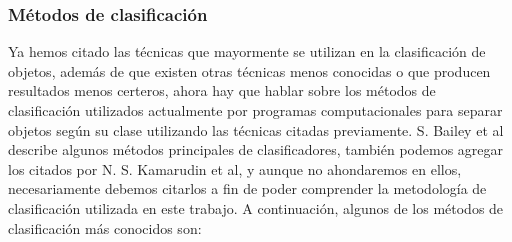 \documentclass[a4paper,12pt,twoside]{article}
\begin{document}
\subsubsection{Métodos de clasificación}
Ya hemos citado las técnicas que mayormente se utilizan en la clasificación de objetos, además de que existen otras técnicas menos conocidas o que producen resultados menos certeros, ahora hay que hablar sobre los métodos de clasificación utilizados actualmente por programas computacionales para separar objetos según su clase utilizando las técnicas citadas previamente.
S. Bailey et al \cite{bailey} describe algunos métodos principales de clasificadores, también podemos agregar los citados por N. S. Kamarudin et al\cite{kamarudin}, y aunque no ahondaremos en ellos, necesariamente debemos citarlos a fin de poder comprender la metodología de clasificación utilizada en este trabajo. A continuación, algunos de los métodos de clasificación más conocidos son:
\end{document}
